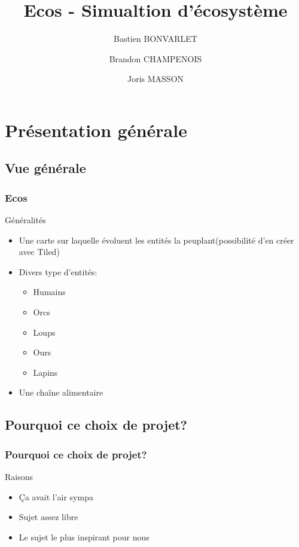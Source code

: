 \documentclass{beamer}
\title{Ecos - Simualtion d'écosystème}
\author{Bastien BONVARLET \and Brandon CHAMPENOIS \and Joris MASSON}
\institute{Université de Caen Normandie}
\begin{document}
\begin{frame}
\titlepage
\end{frame}

\begin{frame}
\tableofcontents
\end{frame}

\section{Présentation générale}
\subsection{Vue générale}

\begin{frame} \frametitle{Ecos}
	\begin{block}{Généralités}
		\begin{itemize}
			\item Une carte sur laquelle évoluent les entités la peuplant(possibilité d'en créer avec Tiled)
			\item Divers type d'entités: 									\begin{itemize}
					\item Humains
					\item Orcs
					\item Loups
					\item Ours
					\item Lapins
				\end{itemize}
			\item Une chaîne alimentaire
		\end{itemize}
	\end{block}
\end{frame}

\subsection{Pourquoi ce choix de projet?}
\begin{frame} \frametitle{Pourquoi ce choix de projet?}
	\begin{block}{Raisons}
		\begin{itemize}
			\item Ça avait l'air sympa
			\item Sujet assez libre
			\item Le sujet le plus inspirant pour nous
		\end{itemize}
	\end{block}
\end{frame}
\end{document}
